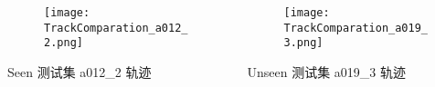 \begin{frame}[t]
\begin{columns}[t]
		\begin{column}{0.3\textwidth}
		   	\begin{figure}
    			\texttt{[image: TrackComparation\_a012\_2.png]}
		   	\end{figure}
		   	\vspace{-0.5cm}
		   	\hspace{1.2cm} {\tiny Seen 测试集 a012\_2 轨迹}
		\end{column}  
		\begin{column}{0.3\textwidth}
		   	\begin{figure}
    			\texttt{[image: TrackComparation\_a019\_3.png]}
		   	\end{figure}
		   	\vspace{-0.5cm}
		   	\hspace{1.2cm} {\tiny Unseen 测试集 a019\_3 轨迹}
		\end{column}
	\end{columns} 	
\end{frame}

